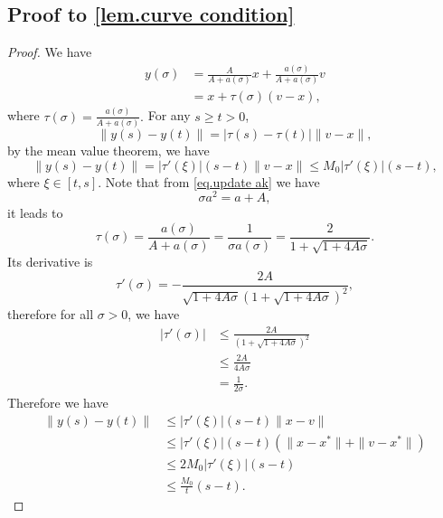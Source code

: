 \documentclass{article}
\begin{document}
\subsection*{Proof to \autoref{lem.curve condition}}
\begin{proof}
    We have
    \begin{equation*}
    \begin{aligned}
        y(\sigma) &= \frac{A}{A+a(\sigma)}x+\frac{a(\sigma)}{A+a(\sigma)}v\\
        &= x + \tau (\sigma) (v-x),
    \end{aligned}
    \end{equation*}
    where $\tau(\sigma) = \frac{a(\sigma)}{A+a(\sigma)}.$ For any $s\geq t>0$,
    \begin{equation*}
        \|y(s)-y(t)\| = \left|\tau(s)-\tau(t)\right| \|v-x\|,
    \end{equation*}
    by the mean value theorem, we have
    \begin{equation*}
        \|y(s)-y(t)\| = \left|\tau'(\xi)\right|(s-t) \|v-x\|\leq M_0\left|\tau'(\xi)\right|(s-t),
    \end{equation*}
    where $\xi \in \left[t,s\right]$. Note that from \eqref{eq.update ak} we have
    \begin{equation*}
        \sigma a^2=a+A,
    \end{equation*}
    it leads to 
    \begin{equation*}
        \tau(\sigma) = \frac{a(\sigma)}{A+a(\sigma)} = \frac{1}{\sigma a(\sigma)} = \frac{2}{1+\sqrt{1+4A\sigma}}.
    \end{equation*}
    Its derivative is
    \begin{equation*}
        \tau'(\sigma) = -\frac{2A}{\sqrt{1+4A\sigma}\left(1+\sqrt{1+4A\sigma}\right)^2},
    \end{equation*}
    therefore for all $\sigma>0$, we have
    \begin{equation*}
    \begin{aligned}
        \left|\tau'(\sigma)\right| &\leq \frac{2A}{\left(1+\sqrt{1+4A\sigma}\right)^2}\\
        &\leq \frac{2A}{4A\sigma}\\
        &= \frac{1}{2\sigma}.
    \end{aligned}
    \end{equation*}
    Therefore we have
    \begin{equation*}
    \begin{aligned}
        \|y(s)-y(t)\|&\leq \left|\tau'(\xi)\right|(s-t)\|x-v\|\\
        &\leq \left|\tau'(\xi)\right|(s-t)\left(\|x-x^*\|+\|v-x^*\|\right)\\
        &\leq 2M_0\left|\tau'(\xi)\right|(s-t)\\
        &\leq \frac{M_0}{t}(s-t).
    \end{aligned}
    \end{equation*}
\end{proof}
\end{document}
